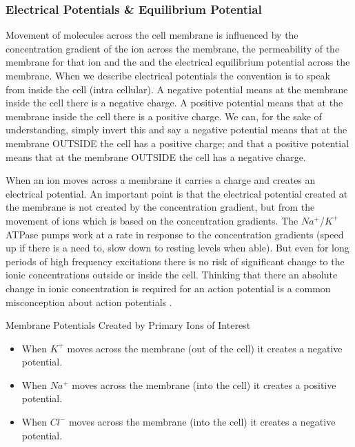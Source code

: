 \subsubsection{Electrical Potentials \& Equilibrium Potential}


Movement of molecules across the cell membrane is influenced by the concentration gradient of the ion across the membrane, the permeability of the membrane for that ion and the and the electrical equilibrium potential across the membrane. When we describe electrical potentials the convention is to speak from inside the cell (intra cellular). A negative potential means at the membrane inside the cell there is a negative charge. A positive potential means that at the membrane inside the cell there is a positive charge. We can, for the sake of understanding, simply invert this and say a negative potential means that at the membrane OUTSIDE the cell has a positive charge; and that a positive potential means that at the membrane OUTSIDE the cell has a negative charge.

When an ion moves across a membrane it carries a charge and creates an electrical potential. An important point is that the electrical potential created at the membrane is not created by the concentration gradient, but from the movement of ions which is based on the concentration gradients.  The $Na^+$/$K^+$ ATPase pumps work at a rate in response to the concentration gradients (speed up if there is a need to, slow down to resting levels when able). But even for long periods of high frequency excitations there is no risk of significant change to the ionic concentrations outside or inside the cell. Thinking that there an absolute change in ionic concentration is required for an action potential is a common misconception about action potentials \cite{silverthorn_uncovering_2002}. 

\begin{backgroundinformation}{Membrane Potentials Created by Primary Ions of Interest}
\begin{itemize}
    \item When $K^+$ moves across the membrane (out of the cell) it creates a negative potential.
    \item When $Na^+$ moves across the membrane (into the cell) it creates a positive potential.
    \item When $Cl^-$ moves across the membrane (into the cell) it creates a negative potential.
\end{itemize}
\end{backgroundinformation}

